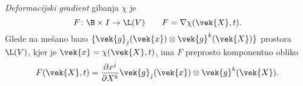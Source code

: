 \emph{Deformacijski gradient} gibanja $\chi$ je
\[ F\colon\B\times I\to \L(V) \qquad F=\nabla\chi(\vek{X},t). \]
Glede na mešano bazo $\{\vek{g}_j(\vek{x})\otimes\vek{g}^k(\vek{X})\}$ prostora $\L(V)$,
kjer je $\vek{x}=\chi(\vek{X},t)$, ima $F$ preprosto komponentno obliko
\[ F(\vek{X},t) = \frac{\partial x^j}{\partial X^k}\vek{g}_j(\vek{x})\otimes\vek{g}^k(\vek{X}). \]